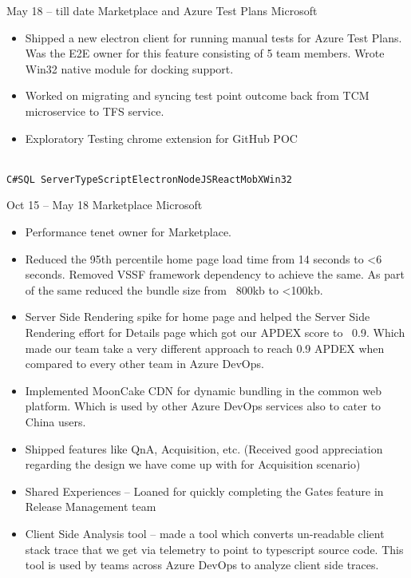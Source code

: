 \documentclass[9pt]{developercv} %
\begin{document}

\begin{entrylist}
	\entry
		{May 18 -- till date}
		{Marketplace and Azure Test Plans}
		{Microsoft}
		{\begin{itemize}
          \item Shipped a new electron client for running manual tests for Azure Test Plans. Was the E2E owner for this feature consisting of 5 team members. Wrote Win32 native module for docking support.
          \item Worked on migrating and syncing test point outcome back from TCM microservice to TFS service.
          \item Exploratory Testing chrome extension for GitHub POC
        \end{itemize}
		\\ \texttt{C\#}\slashsep\texttt{SQL Server}\slashsep\texttt{TypeScript}\slashsep\texttt{Electron}\slashsep\texttt{NodeJS}\slashsep\texttt{React}\slashsep\texttt{MobX}\slashsep\texttt{Win32}}
	\entry
		{Oct 15 -- May 18}
		{Marketplace}
		{Microsoft}
		{\begin{itemize}
          \item Performance tenet owner for Marketplace.
          \item Reduced the 95th percentile home page load time from 14 seconds to <6 seconds. Removed VSSF framework dependency to achieve the same. As part of the same reduced the bundle size from ~800kb to <100kb.
          \item Server Side Rendering spike for home page and helped the Server Side Rendering effort for Details page which got our APDEX score to ~0.9. Which made our team take a very different approach to reach 0.9 APDEX when compared to every other team in Azure DevOps.
          \item Implemented MoonCake CDN for dynamic bundling in the common web platform. Which is used by other Azure DevOps services also to cater to China users.
          \item Shipped features like QnA, Acquisition, etc. (Received good appreciation regarding the design we have come up with for Acquisition scenario)
          \item Shared Experiences – Loaned for quickly completing the Gates feature in Release Management team
          \item Client Side Analysis tool – made a tool which converts un-readable client stack trace that we get via telemetry to point to typescript source code. This tool is used by teams across Azure DevOps to analyze client side traces.

\end{itemize}}
\end{entrylist}
\end{document}
